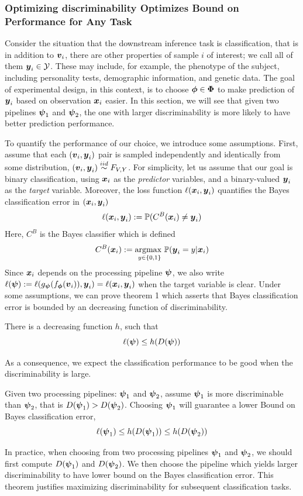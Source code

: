 \documentclass{article}
\begin{document}
\subsubsection{Optimizing discriminability Optimizes Bound on Performance for Any Task}

Consider the situation that the downstream inference task is classification, that is in addition to $\boldsymbol{v}_i$, there are other properties of sample $i$ of interest; we call all of them $\boldsymbol{y}_i \in \mathcal{Y}$.  These may include, for example, the phenotype of the subject, including personality tests, demographic information, and genetic data. The goal of experimental design, in this context, is to choose $\boldsymbol{\phi} \in \boldsymbol{\Phi}$ to make prediction of $\boldsymbol{y}_i$ based on observation $\boldsymbol{x}_i$ easier. In this section, we will see that given two pipelines $\boldsymbol{\psi}_1$ and $\boldsymbol{\psi}_2$, the one with larger discriminability is more likely to have better prediction performance.  

To quantify the performance of our choice, we introduce some assumptions.  First, assume that each $(\boldsymbol{v}_i,\boldsymbol{y}_i)$ pair is sampled independently and identically from some distribution, $(\boldsymbol{v}_i,\boldsymbol{y}_i) \overset{iid}{\sim} F_{V,Y}$. For simplicity, let us assume that our goal is binary classification, using $\boldsymbol{x}_i$ as the \emph{predictor} variables, and a binary-valued $\boldsymbol{y}_i$ as the \emph{target} variable. Moreover, the loss function $\ell( \boldsymbol{x}_i, \boldsymbol{y}_i)$ quantifies the Bayes classification error in $(\boldsymbol{x}_i, \boldsymbol{y}_i)$
\[\ell( \boldsymbol{x}_i, \boldsymbol{y}_i) :=  \mathbb{P}(C^{B}(\boldsymbol{x}_i) \neq \boldsymbol{y}_i) \]
 Here, $C^{B}$ is the Bayes classifier which is defined 
 \[C^{B}(\boldsymbol{x}_i):= \underset{y \in \{0,1\} }{\text{argmax }} \mathbb{P}(\boldsymbol{y}_i=y|\boldsymbol{x}_i)\] 
 Since $\boldsymbol{x}_i$ depends on the processing pipeline $\boldsymbol{\psi}$, we also write $\ell(\boldsymbol{\psi}):=\ell(g_{\boldsymbol{\psi}} (f_{\boldsymbol{\phi}} (\boldsymbol{v}_i) ),\boldsymbol{y}_i)=\ell( \boldsymbol{x}_i, \boldsymbol{y}_i)$ when the target variable is clear. Under some assumptions, we can prove theorem 1 which asserts that Bayes classification error is bounded by an decreasing function of discriminability. 
\begin{thm}	
There is a decreasing function $h$, such that
\[\ell(\boldsymbol{\psi}) \leq h(D(\boldsymbol{\psi})) \]
\end{thm}
As a consequence, we expect the classification performance to be good when the discriminability is large. 
\begin{coro}	
Given two processing pipelines: $\boldsymbol{\psi}_1$ and $\boldsymbol{\psi}_2$, assume $\boldsymbol{\psi}_1$ is more discriminable than $\boldsymbol{\psi}_2$, that is $D(\boldsymbol{\psi}_1) > D(\boldsymbol{\psi}_2)$. Choosing $\boldsymbol{\psi}_1$ will guarantee a lower Bound on Bayes classification error,
\[\ell(\boldsymbol{\psi}_1) \leq h(D(\boldsymbol{\psi}_1)) \leq h(D(\boldsymbol{\psi}_2)) \]
\end{coro}
In practice, when choosing from two processing pipelines $\boldsymbol{\psi}_1$ and $\boldsymbol{\psi}_2$, we should first compute $D(\boldsymbol{\psi}_1)$ and $D(\boldsymbol{\psi}_2)$. We then choose the pipeline which yields larger discriminability to have lower bound on the Bayes classification error. This theorem justifies maximizing discriminability for subsequent classification tasks.
\end{document}
